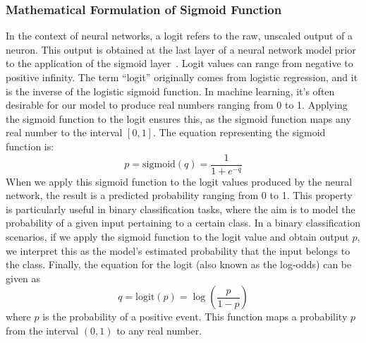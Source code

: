 \documentclass[review,1p,times,numbers]{elsarticle}
\begin{document}
\subsubsection{Mathematical Formulation of Sigmoid Function}
In the context of neural networks, a logit refers to the raw, unscaled output of a neuron. This output is obtained at the last layer of a neural network model prior to the application of the sigmoid layer~\cite{furnieles_Sigmoid_2022}. Logit values can range from negative to positive infinity. The term ``logit'' originally comes from logistic regression, and it is the inverse of the logistic sigmoid function. In machine learning, it's often desirable for our model to produce real numbers ranging from 0 to 1. Applying the sigmoid function to the logit ensures this, as the sigmoid function maps any real number to the interval \([0,1]\).
The equation representing the sigmoid function is:
\begin{equation}
    p = \text{{sigmoid}}(q) = \frac{1}{1 + e^{-q}}
\end{equation}
When we apply this sigmoid function to the logit values produced by the neural network, the result is a predicted probability ranging from 0 to 1. This property is particularly useful in binary classification tasks, where the aim is to model the probability of a given input pertaining to a certain class.
In a binary classification scenarios, if we apply the sigmoid function to the logit value and obtain output \( p \), we interpret this as the model's estimated probability that the input belongs to the class.
Finally, the equation for the logit (also known as the log-odds) can be given as
\begin{equation}
    q = \text{{logit}}(p) = \log \left( \frac{p}{1 - p} \right)
\end{equation}
where \( p \) is the probability of a positive event. This function maps a probability \( p \) from the interval \((0,1)\) to any real number.
\end{document}

